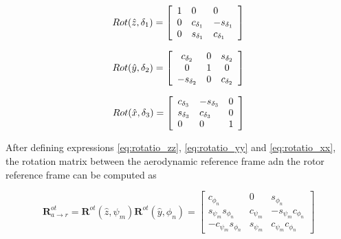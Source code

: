 \begin{equation}
    {R o t({\hat{z}},\delta_1)}={\left[\begin{array}{l l l}{1}&{0}&{0}\\ {0}&{c_{\delta_1}}&{-s_{\delta_1}}\\ {0}&{s_{\delta_1}}&{c_{\delta_1}}\end{array}\right]}
    \label{eq:rotatio_zz}
\end{equation}

\begin{equation}
    Rot(\hat{y},\delta_2)=\left[\begin{array}{c c c}{{c_{\delta_2}}}&{{0}}&{{s_{\delta_2}}}\\ {{0}}&{{1}}&{{0}}\\ {{-s_{\delta_2}}}&{{0}}&{{c_{\delta_2}}}\end{array}\right]
    \label{eq:rotatio_yy}
\end{equation}

\begin{equation}
    Rot({\hat{x}},{\delta_3})={\left[\begin{array}{l l l}{{{c}_{\delta_3}}}&{{-{s}_{\delta_3}}}&{{0}}\\ {{{s}_{\delta_3}}}&{{{c}_{\delta_3}}}&{{0}}\\ {{0}}&{{0}}&{{1}}\end{array}\right]}
        \label{eq:rotatio_xx} 
\end{equation}


After defining expressions \ref{eq:rotatio_zz}, \ref{eq:rotatio_yy} and \ref{eq:rotatio_xx}, the rotation matrix between the aerodynamic reference frame adn the rotor reference frame can be computed as

\begin{equation}
    \boldsymbol{R}^{ot}_{a \to r} = \boldsymbol{R}^{ot}(\hat{z}, \psi_m) \boldsymbol{R}^{ot}(\hat{y}, \phi_n) =
    \begin{bmatrix}
    c_{\phi_n} & 0 & s_{\phi_n} \\
    s_{\psi_m}s_{\phi_n} & c_{\psi_m} & -s_{\psi_m}c_{\phi_n} \\
    -c_{\psi_m}s_{\phi_n} & s_{\psi_m} & c_{\psi_m}c_{\phi_n}
    \end{bmatrix}    
    \label{eq:rotatio_aero_rotor}
\end{equation}




